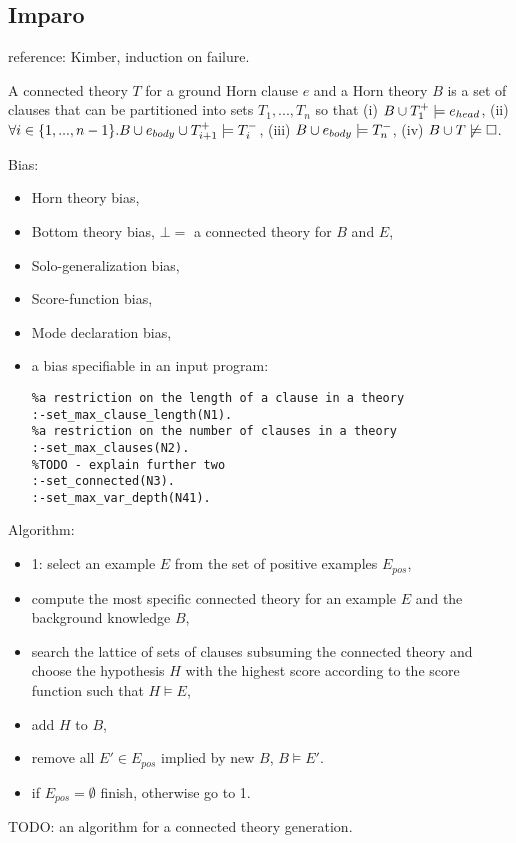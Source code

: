 \iffalse
\subsection{ProGolem}
\begin{itemize}
\item Inverse Entailment,
\item co-generalization, 
\end{itemize}
\fi

\subsection{Imparo}
reference: Kimber, induction on failure.
\begin{defn}
A connected theory $T$ for a ground Horn clause $e$ and a Horn theory $B$ is a set of clauses that can be partitioned into sets $T_1, ..., T_n$ so that
(i) $B \cup T_1^+ \models e_{head}$,
(ii) $\forall i \in \{1, ..., n-1\}. B \cup e_{body} \cup T_{i+1}^+ \models T_i^-$,
(iii) $B \cup e_{body} \models T_n^-$,
(iv) $B \cup T \not\models \square$.

\end{defn}
Bias:
\begin{itemize}
\item Horn theory bias,
\item Bottom theory bias, $\bot=$ a connected theory for $B$ and $E$,
\item Solo-generalization bias,
\item Score-function bias,
\item Mode declaration bias,
\item a bias specifiable in an input program:
\begin{lstlisting}
%a restriction on the length of a clause in a theory
:-set_max_clause_length(N1).
%a restriction on the number of clauses in a theory
:-set_max_clauses(N2).
%TODO - explain further two
:-set_connected(N3).
:-set_max_var_depth(N41).
\end{lstlisting}
\end{itemize}
Algorithm:
\begin{itemize}
\item 1: select an example $E$ from the set of positive examples $E_{pos}$,
\item compute the most specific connected theory for an example $E$ and the background knowledge $B$,
\item search the lattice of sets of clauses subsuming the connected theory and choose the hypothesis $H$ with the highest score according to the score function such that $H \models E$,
\item add $H$ to $B$,
\item remove all $E' \in E_{pos}$ implied by new $B$, $B \models E'$.
\item if $E_{pos} = \emptyset$ finish, otherwise go to 1.
\end{itemize}
TODO: an algorithm for a connected theory generation.

